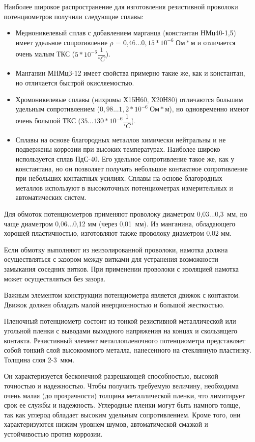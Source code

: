 Наиболее широкое распространение для изготовления резистивной проволоки потенциометров получили следующие сплавы:
\begin{itemize}
\item Медноникелевый сплав с добавлением марганца (константан НМц40-1,5) имеет удельное сопротивление $ \rho $ = 0,46$ \ldots 0,15 * 10^{-6}\;\text{Ом}*\text{м}$ и отличается очень малым ТКС ($ 5*10^{-6} \dfrac{1}{^\circ C} $). 
\item Манганин МНМцЗ-12 имеет свойства примерно такие же, как и константан, но отличается быстрой окисляемостью. 
\item Хромоникелевые сплавы (нихромы Х15Н60, Х20Н80) отличаются большим удельным сопротивлением ($ 0,98\ldots1,2*10^{-6}\;\text{Ом}*\text{м}$), но одновременно имеют очень большой ТКС ($ 35\ldots130*10^{-6}\dfrac{1}{^\circ C} $).
\item Сплавы на основе благородных металлов химически нейтральны и не подвержены коррозии при высоких температурах. Наиболее широко используется сплав ПдС-40. Его удельное сопротивление такое же, как у константана, но он позволяет получать небольшое контактное сопротивление при небольших контактных усилиях. Сплавы на основе благородных металлов используют в высокоточных потенциометрах измерительных и автоматических систем.
\end{itemize}

Для обмоток потенциометров применяют проволоку диаметром 0,03$ \ldots $0,3~мм, но чаще диаметром 0,06$ \ldots $0,12 мм (через 0,01~мм). Из манганина, обладающего хорошей пластичностью, изготовляют также проволоку диаметром 0,02 мм.

Если обмотку выполняют из неизолированной проволоки, намотка должна осуществляться с зазором между витками для устранения возможности замыкания соседних витков. При применении проволоки с изоляцией намотка может осуществляться без зазора. 

Важным элементом конструкции потенциометра является движок с контактом. Движок должен обладать малой инерционностью и большой жесткостью. 

Пленочный потенциометр состоит из тонкой резистивной металлической или угольной пленки с выводами выходного напряжения на концах и скользящего контакта. Резистивный элемент металлопленочного потенциометра представляет собой тонкий слой высокоомного металла, нанесенного на стеклянную пластинку. Толщина слоя 2-3~мкм.

Он характеризуется бесконечной разрешающей способностью, высокой точностью и надежностью. Чтобы получить требуемую величину, необходима очень малая (до прозрачности) толщина металлической пленки, что лимитирует срок ее службы и надежность. Углеродные пленки могут быть намного толще, так как углерод обладает высоким удельным сопротивлением. Кроме того, они характеризуются низким уровнем шумов, автоматической смазкой и устойчивостью против коррозии.

